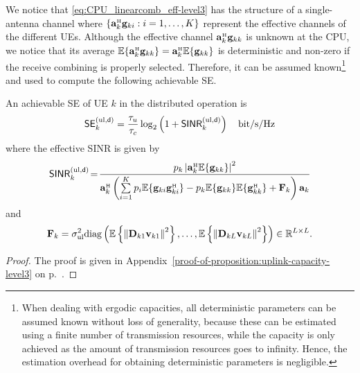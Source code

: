 We notice that \eqref{eq:CPU_linearcomb_eff-level3} has the structure of a single-antenna channel where $\{\vect{a}_{k}^{\Htran}\vect{g}_{ki}: i=1,\ldots,K\}$ represent the effective channels of the different UEs. 
 Although the effective channel $\vect{a}_{k}^{\Htran}\vect{g}_{kk}$ is unknown at the CPU, we notice that its average $\mathbb{E}\{\vect{a}_{k}^{\Htran}  \vect{g}_{kk}\} = \vect{a}_{k}^{\Htran} \mathbb{E}\{ \vect{g}_{kk}\}$ is deterministic and non-zero if the receive combining is properly selected. Therefore, it can be assumed known\footnote{When dealing with ergodic capacities, all deterministic parameters can be assumed known without loss of generality, because these can be estimated using a finite number of transmission resources, while the capacity is only achieved as the amount of transmission resources goes to infinity. Hence, the estimation overhead for obtaining deterministic parameters is  negligible.}
and used to compute the following achievable SE. 

\begin{theorem} \label{theorem:uplink-capacity-level3}
An achievable SE of UE $k$ in the distributed operation is
	\begin{equation} \label{eq:uplink-rate-expression-level3}
	\begin{split}
	\mathsf{SE}_{k}^{({\rm ul},\mathsf{d})} = \frac{\tau_u}{\tau_c} \log_2  \left( 1 + \mathsf{SINR}_{k}^{({\rm ul},\mathsf{d})}  \right) \quad \textrm{bit/s/Hz}
	\end{split}
	\end{equation}
	where the effective SINR is given by
	\begin{equation} \label{eq:uplink-instant-SINR-level3}
	\mathacr{SINR}_{k}^{({\rm ul},\dist)}\! =\!  \frac{ p_{k} \left| \vect{a}_{k}^{\Htran} \mathbb{E}\{ \vect{g}_{kk}\} \right|^2  }{ 
	 \vect{a}_{k}^{\Htran} \left(
\sum\limits_{i=1}^{K} p_{i} \mathbb{E} \{  \vect{g}_{ki} \vect{g}_{ki}^{\Htran}  \} - p_{k}  \mathbb{E}\{ \vect{g}_{kk}\} \mathbb{E}\{ \vect{g}_{kk}^{\Htran}\} + 
		\vect{F}_{k}
		\right)
		\vect{a}_{k} 
	}
	\end{equation}
	and
	\begin{equation}
	\mathbf{F}_{k}=\sigma^2_{\mathrm{ul}}\mathrm{diag}\left(\mathbb{E}\left\{ \left\|  \mathbf{D}_{k1}\mathbf{v}_{k1}  \right\|^2\right\}, \ldots, \mathbb{E}\left\{ \left\|  \mathbf{D}_{kL}\mathbf{v}_{kL}  \right\|^2\right\}\right) \in \mathbb{R}^{L \times L}.
	\end{equation}
\end{theorem}
\begin{proof}
The proof is given in Appendix~\ref{proof-of-proposition:uplink-capacity-level3} on p.~\pageref{proof-of-proposition:uplink-capacity-level3}.
\end{proof}



